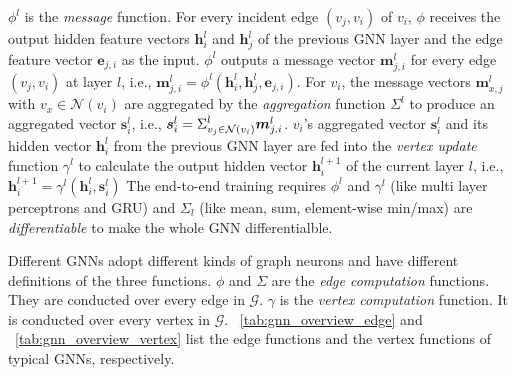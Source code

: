 $\phi^l$ is the \emph{message} function.
For every incident edge $(v_j, v_i)$ of $v_i$, $\phi$ receives the output hidden feature vectors $\boldsymbol{h}^l_i$ and $\boldsymbol{h}^l_j$ of the previous GNN layer and the edge feature vector $\boldsymbol{e}_{j,i}$ as the input.
$\phi^l$ outputs a message vector $\boldsymbol{m}^l_{j,i}$ for every edge $(v_j, v_i)$ at layer $l$, i.e., $\boldsymbol{m}^l_{j,i}=\phi^l(\boldsymbol{h}^l_i, \boldsymbol{h}^l_j, \boldsymbol{e}_{j,i})$.
For $v_i$, the message vectors $\boldsymbol{m}^l_{x,j}$ with $v_x \in \mathcal{N}(v_i)$ are aggregated by the \emph{aggregation} function $\Sigma^l$ to produce an aggregated vector $\boldsymbol{s}^l_i$, i.e., $\boldsymbol{s}^l_i=\mathlarger{\Sigma}^l_{v_j \in \mathcal{N}(v_i)}\boldsymbol{m}^l_{j,i}$.
$v_i$'s aggregated vector $\boldsymbol{s}^l_i$ and its hidden vector $\boldsymbol{h}^l_i$ from the previous GNN layer are fed into the \emph{vertex update} function $\gamma^l$ to calculate the output hidden vector $\boldsymbol{h}^{l+1}_i$ of the current layer $l$, i.e., $\boldsymbol{h}^{l+1}_i = \gamma^l(\boldsymbol{h}^l_i, \boldsymbol{s}^l_i)$
The end-to-end training requires $\phi^l$ and $\gamma^l$ (like multi layer perceptrons and GRU) and $\Sigma_l$ (like mean, sum, element-wise min/max) are \emph{differentiable} to make the whole GNN differentialble.

Different GNNs adopt different kinds of graph neurons and have different definitions of the three functions.
$\phi$ and $\Sigma$ are the \emph{edge computation} functions.
They are conducted over every edge in $\mathcal{G}$.
$\gamma$ is the \emph{vertex computation} function.
It is conducted over every vertex in $\mathcal{G}$.
\tablename~\ref{tab:gnn_overview_edge} and \tablename~\ref{tab:gnn_overview_vertex} list the edge functions and the vertex functions of typical GNNs, respectively.

